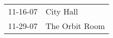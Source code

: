 \begin{supertabular}{p{0.25\columnwidth}p{0.75\columnwidth}}
 11-16-07 &       City Hall \\
 11-29-07 &  The Orbit Room \\
\end{supertabular}
